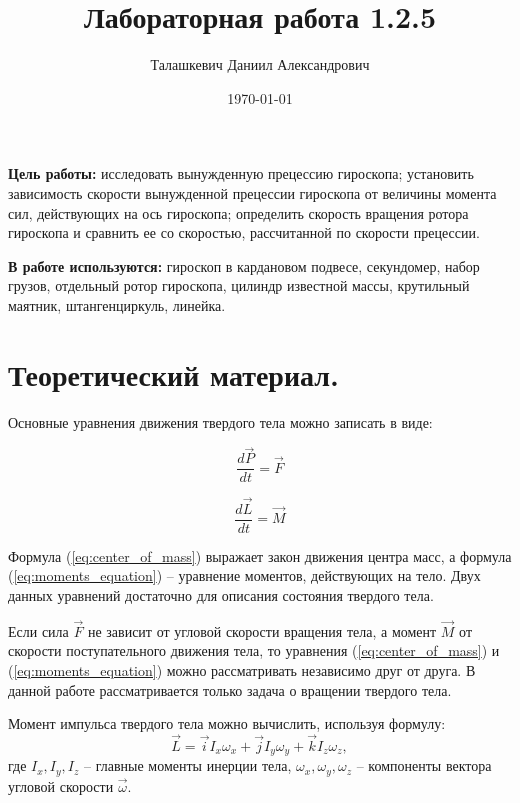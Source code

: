 \documentclass[a4paper,12pt]{article}
\author{Талашкевич Даниил Александрович}
\title{Лабораторная работа 1.2.5}
\date{\today}
\begin{document}
\maketitle
\thispagestyle{empty}

\newpage
\setcounter{page}{1}

	\textbf{Цель работы:} исследовать вынужденную прецессию гироскопа; установить зависимость скорости вынужденной прецессии гироскопа от величины момента сил, действующих на ось гироскопа; определить скорость вращения ротора гироскопа и сравнить ее со скоростью, рассчитанной по скорости прецессии.
	
	\textbf{В работе используются:} гироскоп в кардановом подвесе, секундомер, набор грузов, отдельный ротор гироскопа, цилиндр известной массы, крутильный маятник, штангенциркуль, линейка. 


\section{Теоретический материал.}

Основные уравнения движения твердого тела можно записать в виде:

\begin{equation}
	\frac{d\vec{P}}{dt} = \vec{F}
	\label{eq:center_of_mass}
\end{equation}

\begin{equation}
	\frac{d\vec{L}}{dt} = \vec{M}
	\label{eq:moments_equation}
\end{equation}

Формула (\ref{eq:center_of_mass}) выражает закон движения центра масс, а формула (\ref{eq:moments_equation}) -- уравнение моментов, действующих на тело. Двух данных уравнений достаточно для описания состояния твердого тела.

Если сила $\vec{F}$ не зависит от угловой скорости вращения тела, а момент $\vec{M}$ от скорости поступательного движения тела, то уравнения (\ref{eq:center_of_mass}) и (\ref{eq:moments_equation}) можно рассматривать независимо друг от друга. В данной работе рассматривается только задача о вращении твердого тела.

Момент импульса твердого тела можно вычислить, используя формулу:
\begin{equation}
	\vec{L} = \vec{i}I_{x}\omega_{x} + \vec{j}I_{y}\omega_{y} + \vec{k}I_{z}\omega_{z},
\end{equation}
где $ I_{x},I_{y},I_{z} $ -- главные моменты инерции тела, $ \omega_{x}, \omega_{y}, \omega_{z} $ -- компоненты вектора угловой скорости  $\vec{\omega} $.
\end{document}
